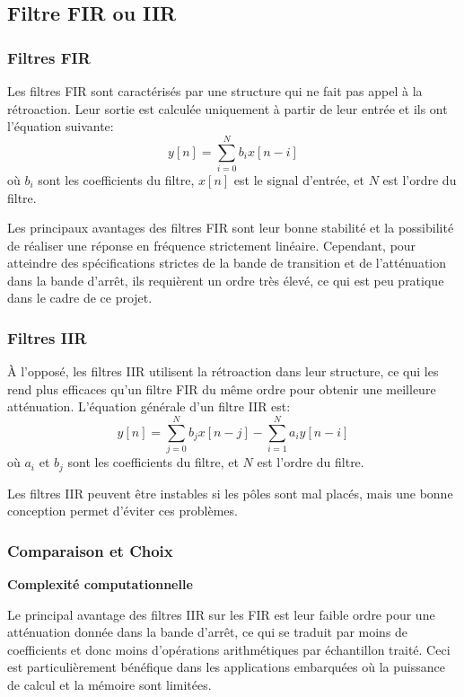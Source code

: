 \subsection{Filtre FIR ou IIR}

\subsubsection{Filtres FIR}

Les filtres FIR sont caractérisés par une structure qui ne fait pas appel à la rétroaction. Leur sortie est calculée uniquement à partir de leur entrée et ils ont l'équation suivante:
\[
y[n] = \sum_{i=0}^{N} b_i x[n-i]
\]
où $b_i$ sont les coefficients du filtre, $x[n]$ est le signal d'entrée, et $N$ est l'ordre du filtre.

Les principaux avantages des filtres FIR sont leur bonne stabilité et la possibilité de réaliser une réponse en fréquence strictement linéaire. Cependant, pour atteindre des spécifications strictes de la bande de transition et de l'atténuation dans la bande d'arrêt, ils requièrent un ordre très élevé, ce qui est peu pratique dans le cadre de ce projet.

\subsubsection{Filtres IIR}

À l'opposé, les filtres IIR utilisent la rétroaction dans leur structure, ce qui les rend plus efficaces qu'un filtre FIR du même ordre pour obtenir une meilleure atténuation. L'équation générale d'un filtre IIR est:
\[
y[n] =  \sum_{j=0}^{N} b_j x[n-j] - \sum_{i=1}^{N} a_i y[n-i]
\]
où $a_i$ et $b_j$ sont les coefficients du filtre, et $N$ est l'ordre du filtre.

Les filtres IIR peuvent être instables si les pôles sont mal placés, mais une bonne conception permet d'éviter ces problèmes.

\subsubsection{Comparaison et Choix}

\textbf{Complexité computationnelle}

Le principal avantage des filtres IIR sur les FIR est leur faible ordre pour une atténuation donnée dans la bande d'arrêt, ce qui se traduit par moins de coefficients et donc moins d'opérations arithmétiques par échantillon traité. Ceci est particulièrement bénéfique dans les applications embarquées où la puissance de calcul et la mémoire sont limitées.

